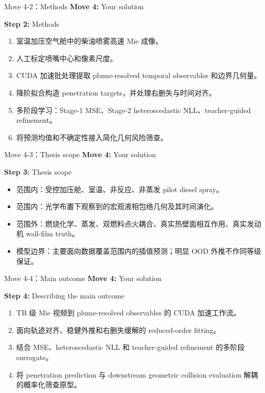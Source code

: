 \documentclass[aspectratio=169,11pt]{beamer}
\newcommand{\movetag}[2]{\textbf{Move #1:} #2}
\newcommand{\steptag}[2]{\textbf{Step #1:} #2}
\begin{document}
\begin{frame}{Move 4-2：Methods}
\small
\movetag{4}{Your solution}

\vspace{0.5em}
\steptag{2}{Methods}

\vspace{0.8em}
\begin{enumerate}
  \item 室温加压空气舱中的柴油喷雾高速 Mie 成像。
  \item 人工标定喷嘴中心和像素尺度。
  \item CUDA 加速批处理提取 plume-resolved temporal observables 和边界几何量。
  \item 降阶拟合构造 penetration targets，并处理右删失与时间对齐。
  \item 多阶段学习：Stage-1 MSE、Stage-2 heteroscedastic NLL、teacher-guided refinement。
  \item 将预测均值和不确定性接入简化几何风险筛查。
\end{enumerate}
\end{frame}

\begin{frame}{Move 4-3：Thesis scope}
\small
\movetag{4}{Your solution}

\vspace{0.5em}
\steptag{3}{Thesis scope}

\vspace{0.8em}
\begin{itemize}
  \item 范围内：受控加压舱、室温、非反应、非蒸发 pilot diesel spray。
  \item 范围内：光学布置下观察到的宏观液相包络几何及其时间演化。
  \item 范围外：燃烧化学、蒸发、双燃料点火耦合、真实热壁面相互作用、真实发动机 wall-film truth。
  \item 模型边界：主要面向数据覆盖范围内的插值预测；明显 OOD 外推不作同等级保证。
\end{itemize}
\end{frame}

\begin{frame}{Move 4-4：Main outcome}
\small
\movetag{4}{Your solution}

\vspace{0.5em}
\steptag{4}{Describing the main outcome}

\vspace{0.8em}
\begin{enumerate}
  \item TB 级 Mie 视频到 plume-resolved observables 的 CUDA 加速工作流。
  \item 面向轨迹对齐、稳健外推和右删失缓解的 reduced-order fitting。
  \item 结合 MSE、heteroscedastic NLL 和 teacher-guided refinement 的多阶段 surrogate。
  \item 将 penetration prediction 与 downstream geometric collision evaluation 解耦的概率化筛查原型。
\end{enumerate}
\end{frame}
\end{document}
